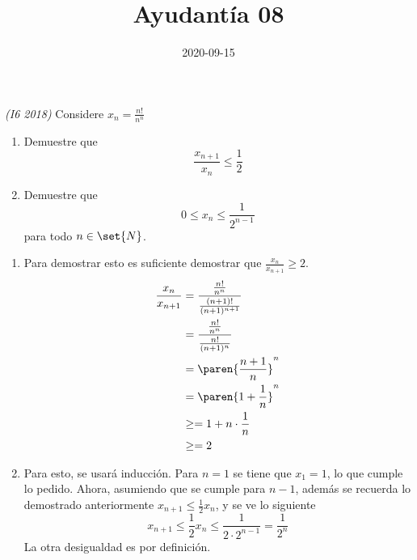 \documentclass{ayudantia}
\title{Ayudantía 08}
\date{2020-09-15}
\begin{document}
\maketitle

\begin{prob}\textit{(I6 2018)}
    Considere \(x_n=\frac{n!}{n^n}\)
    \begin{enumerate}[label=(\alph*)]
        \item Demuestre que
              \begin{equation*}
                  \frac{x_{n+1}}{x_n}\leq\frac12
              \end{equation*}
        \item Demuestre que
              \begin{equation*}
                  0\leq x_n\leq\frac1{2^{n-1}}
              \end{equation*}
              para todo \(n\in\set{N}\).
    \end{enumerate}
\end{prob}

\begin{ans}
    \begin{sol}
        \begin{enumerate}[label=(\alph*)]
            \item Para demostrar esto es suficiente demostrar que \(\frac{x_n}{x_{n+1}}\geq 2\).
                  \begin{align*}
                      \frac{x_n}{x_{n+1}} & =\frac{\frac{n!}{n^n}}{\frac{(n+1)!}{(n+1)^{n+1}}}\\
                      & =\frac{\frac{n!}{n^n}}{\frac{n!}{(n+1)^n}}\\
                      & =\paren{\frac{n+1}n}^n\\
                      & =\paren{1+\frac{1}n}^n\\
                      &\geq =1+n\cdot\frac1n\\
                      &\geq =2\\
                  \end{align*}
            \item Para esto, se usará inducción. Para \(n=1\) se tiene que \(x_1=1\), lo que cumple lo pedido. Ahora, asumiendo que se cumple para \(n-1\), además se recuerda lo demostrado anteriormente \(x_{n+1}\leq\frac12x_n\), y se ve lo siguiente
            \begin{equation*}
                x_{n+1}\leq\frac12x_n\leq\frac1{2\cdot 2^{n-1}}=\frac1{2^n}
            \end{equation*}
            La otra desigualdad es por definición.
        \end{enumerate}
    \end{sol}
\end{ans}
\end{document}
